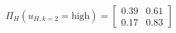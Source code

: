 \documentclass[border=3mm,preview]{standalone}\usepackage{amsmath}
\begin{document}
\[
\Pi_{H} \left( u_{H,k=2} = \text{high} \right)= 
\left[\begin{array}{cc} 
0.39 & 0.61 \\ 
0.17 & 0.83 
\end{array}\right] \] 
\end{document}
